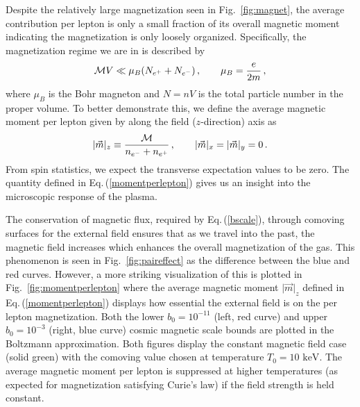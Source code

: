 \documentclass[a4paper]{article}
\newcommand*{\keV}{\text{ keV}}
\newcommand{\req}[1]{Eq.\,(\ref{#1})}
\newcommand{\rf}[1]{Fig.~{\ref{#1}}}
\begin{document}
Despite the relatively large magnetization seen in \rf{fig:magnet}, the average contribution per lepton is only a small fraction of its overall magnetic moment indicating the magnetization is only loosely organized. Specifically, the magnetization regime we are in is described by
\begin{align}
    \label{fractionalmagnetization}
    {\cal M}V\ll\mu_{B}(N_{e^{+}}+N_{e^{-}})\,,\qquad\mu_{B}=\frac{e}{2m}\,,
\end{align}
where $\mu_{B}$ is the Bohr magneton and $N=nV$ is the total particle number in the proper volume. To better demonstrate this, we define the average magnetic moment per lepton given by along the field ($z$-direction) axis as
\begin{align}
    \label{momentperlepton}
    \vert\vec{m}\vert_{z}\equiv\frac{{\cal M}}{n_{e^{-}}+n_{e^{+}}}\,,\qquad\vert\vec{m}\vert_{x}=\vert\vec{m}\vert_{y}=0\,.
\end{align}
From spin statistics, we expect the transverse expectation values to be zero. The quantity defined in \req{momentperlepton} gives us an insight into the microscopic response of the plasma.

The conservation of magnetic flux, required by \req{bscale}, through comoving surfaces for the external field ensures that as we travel into the past, the magnetic field increases which enhances the overall magnetization of the gas. This phenomenon is seen in \rf{fig:paireffect} as the difference between the blue and red curves. However, a more striking visualization of this is plotted in \rf{fig:momentperlepton} where the average magnetic moment $\vert\vec{m}\vert_{z}$ defined in \req{momentperlepton} displays how essential the external field is on the per lepton magnetization. Both the lower $b_{0}=10^{-11}$ (left, red curve) and upper $b_{0}=10^{-3}$ (right, blue curve) cosmic magnetic scale bounds are plotted in the Boltzmann approximation. Both figures display the constant magnetic field case (solid green) with the comoving value chosen at temperature $T_{0}=10\keV$. The average magnetic moment per lepton is suppressed at higher temperatures (as expected for magnetization satisfying Curie's law) if the field strength is held constant.
\end{document}
